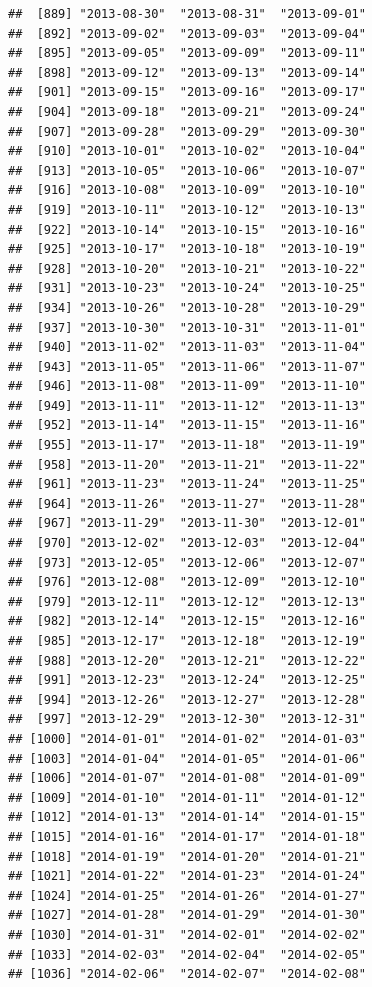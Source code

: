 \documentclass[10pt]{article}\usepackage[]{graphicx}\usepackage[]{color}
\makeatletter
\newenvironment{kframe}{%
 \def\at@end@of@kframe{}%
 \ifinner\ifhmode%
  \def\at@end@of@kframe{\end{minipage}}%
  \begin{minipage}{\columnwidth}%
 \fi\fi%
 \def\FrameCommand##1{\hskip\@totalleftmargin \hskip-\fboxsep
 \colorbox{shadecolor}{##1}\hskip-\fboxsep
     \hskip-\linewidth \hskip-\@totalleftmargin \hskip\columnwidth}%
 \MakeFramed {\advance\hsize-\width
   \@totalleftmargin\z@ \linewidth\hsize
   \@setminipage}}%
 {\par\unskip\endMakeFramed%
 \at@end@of@kframe}
\newenvironment{knitrout}{}{} %
\theoremstyle{plain}
\makeatother
\begin{document}
\begin{knitrout}
\begin{kframe}
\begin{verbatim}
##  [889] "2013-08-30"  "2013-08-31"  "2013-09-01" 
##  [892] "2013-09-02"  "2013-09-03"  "2013-09-04" 
##  [895] "2013-09-05"  "2013-09-09"  "2013-09-11" 
##  [898] "2013-09-12"  "2013-09-13"  "2013-09-14" 
##  [901] "2013-09-15"  "2013-09-16"  "2013-09-17" 
##  [904] "2013-09-18"  "2013-09-21"  "2013-09-24" 
##  [907] "2013-09-28"  "2013-09-29"  "2013-09-30" 
##  [910] "2013-10-01"  "2013-10-02"  "2013-10-04" 
##  [913] "2013-10-05"  "2013-10-06"  "2013-10-07" 
##  [916] "2013-10-08"  "2013-10-09"  "2013-10-10" 
##  [919] "2013-10-11"  "2013-10-12"  "2013-10-13" 
##  [922] "2013-10-14"  "2013-10-15"  "2013-10-16" 
##  [925] "2013-10-17"  "2013-10-18"  "2013-10-19" 
##  [928] "2013-10-20"  "2013-10-21"  "2013-10-22" 
##  [931] "2013-10-23"  "2013-10-24"  "2013-10-25" 
##  [934] "2013-10-26"  "2013-10-28"  "2013-10-29" 
##  [937] "2013-10-30"  "2013-10-31"  "2013-11-01" 
##  [940] "2013-11-02"  "2013-11-03"  "2013-11-04" 
##  [943] "2013-11-05"  "2013-11-06"  "2013-11-07" 
##  [946] "2013-11-08"  "2013-11-09"  "2013-11-10" 
##  [949] "2013-11-11"  "2013-11-12"  "2013-11-13" 
##  [952] "2013-11-14"  "2013-11-15"  "2013-11-16" 
##  [955] "2013-11-17"  "2013-11-18"  "2013-11-19" 
##  [958] "2013-11-20"  "2013-11-21"  "2013-11-22" 
##  [961] "2013-11-23"  "2013-11-24"  "2013-11-25" 
##  [964] "2013-11-26"  "2013-11-27"  "2013-11-28" 
##  [967] "2013-11-29"  "2013-11-30"  "2013-12-01" 
##  [970] "2013-12-02"  "2013-12-03"  "2013-12-04" 
##  [973] "2013-12-05"  "2013-12-06"  "2013-12-07" 
##  [976] "2013-12-08"  "2013-12-09"  "2013-12-10" 
##  [979] "2013-12-11"  "2013-12-12"  "2013-12-13" 
##  [982] "2013-12-14"  "2013-12-15"  "2013-12-16" 
##  [985] "2013-12-17"  "2013-12-18"  "2013-12-19" 
##  [988] "2013-12-20"  "2013-12-21"  "2013-12-22" 
##  [991] "2013-12-23"  "2013-12-24"  "2013-12-25" 
##  [994] "2013-12-26"  "2013-12-27"  "2013-12-28" 
##  [997] "2013-12-29"  "2013-12-30"  "2013-12-31" 
## [1000] "2014-01-01"  "2014-01-02"  "2014-01-03" 
## [1003] "2014-01-04"  "2014-01-05"  "2014-01-06" 
## [1006] "2014-01-07"  "2014-01-08"  "2014-01-09" 
## [1009] "2014-01-10"  "2014-01-11"  "2014-01-12" 
## [1012] "2014-01-13"  "2014-01-14"  "2014-01-15" 
## [1015] "2014-01-16"  "2014-01-17"  "2014-01-18" 
## [1018] "2014-01-19"  "2014-01-20"  "2014-01-21" 
## [1021] "2014-01-22"  "2014-01-23"  "2014-01-24" 
## [1024] "2014-01-25"  "2014-01-26"  "2014-01-27" 
## [1027] "2014-01-28"  "2014-01-29"  "2014-01-30" 
## [1030] "2014-01-31"  "2014-02-01"  "2014-02-02" 
## [1033] "2014-02-03"  "2014-02-04"  "2014-02-05" 
## [1036] "2014-02-06"  "2014-02-07"  "2014-02-08" 

\end{verbatim}
\end{kframe}
\end{knitrout}
\end{document}

